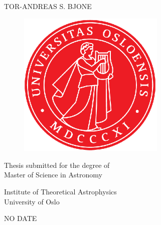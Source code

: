 \begin{titlepage}
\begin{center}

\bfseries
\huge%
\mintittel

\vspace{2cm}
\LARGE
TOR-ANDREAS S. BJONE


\vspace{1cm}
\begin{figure}[h]
\centering
\includegraphics[width=7cm]{uiologo.eps}
\centering
\end{figure}
\vspace{3cm}
\Large
Thesis submitted for the degree of \\
Master of Science in Astronomy%

\vspace{0.8cm}
\large
Institute of Theoretical Astrophysics\\
University of Oslo

\vspace{0.8cm}
NO DATE

\end{center}
\normalfont

\end{titlepage}
